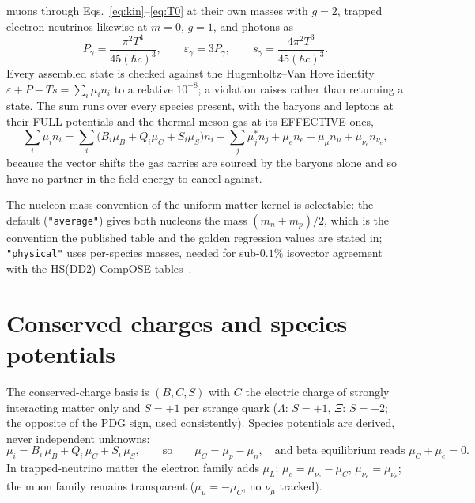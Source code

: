 \documentclass[aps,prc,onecolumn,superscriptaddress,nofootinbib,10pt]{revtex4-2}
\newcommand{\muB}{\mu_B}
\newcommand{\muC}{\mu_C}
\newcommand{\muS}{\mu_S}
\newcommand{\munue}{\mu_{\nu_e}}
\begin{document}
muons through Eqs.~\eqref{eq:kin}--\eqref{eq:T0} at their own masses with
$g = 2$, trapped electron neutrinos likewise at $m = 0$, $g = 1$, and photons
as
%
\begin{equation}
P_\gamma = \frac{\pi^2 T^4}{45 (\hbar c)^3}, \qquad
\varepsilon_\gamma = 3 P_\gamma, \qquad
s_\gamma = \frac{4\pi^2 T^3}{45 (\hbar c)^3} .
\label{eq:photons}
\end{equation}
%
Every assembled state is checked against the Hugenholtz--Van Hove
identity~\cite{HugenholtzVanHove1958}
$\varepsilon + P - T s = \sum_i \mu_i n_i$ to a relative $10^{-8}$; a
violation raises rather than returning a state. The sum runs over every
species present, with the baryons and leptons at their FULL potentials and the
thermal meson gas at its EFFECTIVE ones,
%
\begin{equation}
\sum_i \mu_i n_i
  = \sum_i \big( B_i \muB + Q_i \muC + S_i \muS \big) n_i
  + \sum_j \mu^{*}_j n_j
  + \mu_e n_e + \mu_\mu n_\mu + \munue n_{\nu_e} ,
\label{eq:eulersum}
\end{equation}
%
because the vector shifts the gas carries are sourced by the baryons alone and
so have no partner in the field energy to cancel against.

The nucleon-mass convention of the uniform-matter kernel is selectable: the
default (\texttt{"average"}) gives both nucleons the mass
$(m_n + m_p)/2$, which is the convention the published table and the golden
regression values are stated in; \texttt{"physical"} uses per-species masses,
needed for sub-$0.1\%$ isovector agreement with the HS(DD2) CompOSE
tables~\cite{HempelSchaffnerBielich2010,TypelCompOSE2015}.

\section{Conserved charges and species potentials}

The conserved-charge basis is $(B, C, S)$ with $C$ the electric charge of
strongly interacting matter only and $S = +1$ per strange quark ($\Lambda$:
$S=+1$, $\Xi$: $S=+2$; the opposite of the PDG sign, used consistently).
Species potentials are derived, never independent unknowns:
%
\begin{equation}
\mu_i = B_i\, \muB + Q_i\, \muC + S_i\, \muS ,
\qquad\text{so}\qquad
\muC = \mu_p - \mu_n,
\quad \text{and beta equilibrium reads } \muC + \mu_e = 0 .
\label{eq:basis}
\end{equation}
%
In trapped-neutrino matter the electron family adds $\mu_{L}$:
$\mu_e = \munue - \muC$, $\mu_{\nu_e} = \munue$; the muon family remains
transparent ($\mu_\mu = -\muC$, no $\nu_\mu$ tracked).
\end{document}
